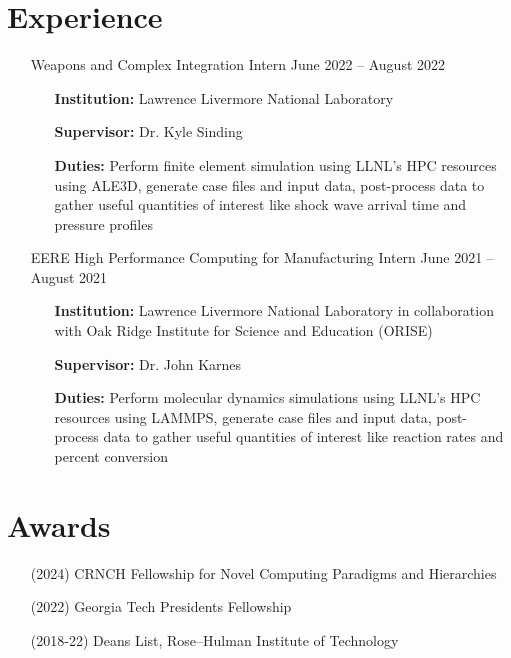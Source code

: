 \documentclass{article}
\begin{document}
\section{Experience}
\begin{itemize}
    \item[\faLandmark] Weapons and Complex Integration Intern \hfill June 2022 -- August 2022
    \begin{itemize}[leftmargin=0.875in]
        \setlength\itemsep{-0.3em}
        \item[\textbf{Institution:}] Lawrence Livermore National Laboratory
        \item[\textbf{Supervisor:}] Dr. Kyle Sinding
        \item[\textbf{Duties:}] Perform finite element simulation using LLNL's HPC resources using ALE3D, generate case files and input data, post-process data to gather useful quantities of interest like shock wave arrival time and pressure profiles
    \end{itemize}
    \item[\faLandmark]  EERE High Performance Computing for Manufacturing Intern \hfill June 2021 -- August 2021
    \begin{itemize}[leftmargin=0.875in]
        \setlength\itemsep{-0.3em}
        \item[\textbf{Institution:}] Lawrence Livermore National Laboratory in collaboration with Oak Ridge Institute for Science and Education (ORISE)
        \item[\textbf{Supervisor:}] Dr. John Karnes
        \item[\textbf{Duties:}] Perform molecular dynamics simulations using LLNL's HPC resources using LAMMPS, generate case files and input data, post-process data to gather useful quantities of interest like reaction rates and percent conversion

    \end{itemize}
\end{itemize}

\section{Awards}
\begin{itemize}
    \item[\faAward] (2024) CRNCH Fellowship for Novel Computing Paradigms and Hierarchies
    \item[\faAward] (2022) Georgia Tech Presidents Fellowship
    \item[\faAward] (2018-22) Deans List, Rose--Hulman Institute of Technology
\end{itemize}
\end{document}
